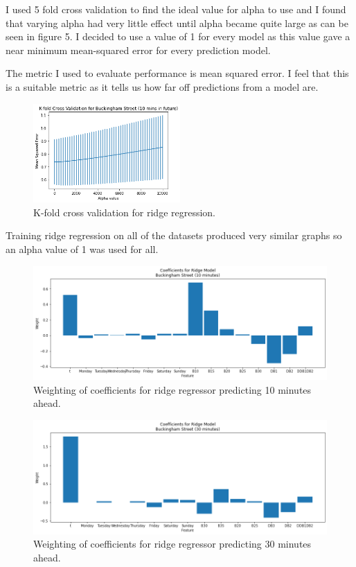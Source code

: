 I used 5 fold cross validation to find the ideal value for alpha to use and I found that varying alpha had very little effect until alpha became quite large 
as can be seen in figure 5. 
I decided to use a value of 1 for every model as this value gave a near minimum mean-squared error for every prediction model.
\par 
The metric I used to evaluate performance is mean squared error. 
I feel that this is a suitable metric as it tells us how far off predictions from a model are. 
\par
\begin{figure}[H]
    \centering
    \includegraphics[width=0.5\textwidth]{images/ridge_kfold1.png}
    \caption{K-fold cross validation for ridge regression.}
    \end{figure}
\par 

Training ridge regression on all of the datasets produced very similar graphs so an alpha value of 1 was used for all.

\begin{figure}[H]
    \centering
    \includegraphics[width=1\textwidth]{images/coefficients1.png}
    \caption{Weighting of coefficients for ridge regressor predicting 10 minutes ahead.}
    \end{figure}
\par 
\begin{figure}[H]
    \centering
    \includegraphics[width=1\textwidth]{images/coefficients3.png}
    \caption{Weighting of coefficients for ridge regressor predicting 30 minutes ahead.}
    \end{figure}
\par 


